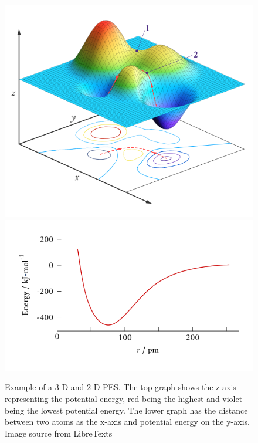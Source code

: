 \documentclass[12pt, abstract = true]{scrartcl}
\begin{document}
\begin{figure}
  \centering
  \includegraphics[scale=.4]{pes.png}
  \includegraphics[scale=.4]{pes2.png}
  
  \caption{Example of a 3-D and 2-D PES. The top graph shows the z-axis representing the potential energy, red being the highest and violet being the lowest potential energy. The lower graph has the distance between two atoms as the x-axis and potential energy on the y-axis. Image source from LibreTexts\cite{pesimage}}\label{fig:pes}
\end{figure}
\end{document}
